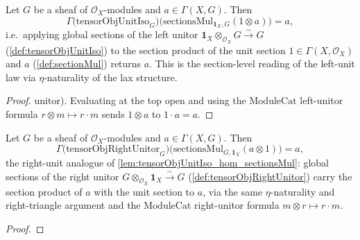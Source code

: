\begin{lemma}

  \label{lem:tensorObjUnitIso_hom_sectionsMul}
  Let \(G\) be a sheaf of \(\mathcal{O}_X\)-modules and \(a \in \Gamma(X, G)\).
  Then
  \[
    \Gamma\bigl(\mathrm{tensorObjUnitIso}_G\bigr)
      \bigl(\mathrm{sectionsMul}_{\mathbf{1}_X, G}(1 \otimes a)\bigr) = a,
  \]
  i.e.\ applying global sections of the left unitor
  \(\mathbf{1}_X \otimes_{\mathcal{O}_X} G \xrightarrow{\sim} G\)
  (\cref{def:tensorObjUnitIso}) to the section product of the unit section
  \(1 \in \Gamma(X,\mathcal{O}_X)\) and \(a\) (\cref{def:sectionMul}) returns
  \(a\). This is the section-level reading of the left-unit law via
  \(\eta\)-naturality of the lax structure.
\end{lemma}

\begin{proof}
  \leanok
  unitor). Evaluating at the top open and using the \(\mathrm{ModuleCat}\)
  left-unitor formula \(r \otimes m \mapsto r \cdot m\) sends \(1 \otimes a\) to
  \(1 \cdot a = a\).
\end{proof}

\begin{lemma}

  \label{lem:tensorObjRightUnitor_hom_sectionsMul}
  Let \(G\) be a sheaf of \(\mathcal{O}_X\)-modules and \(a \in \Gamma(X, G)\).
  Then
  \[
    \Gamma\bigl(\mathrm{tensorObjRightUnitor}_G\bigr)
      \bigl(\mathrm{sectionsMul}_{G, \mathbf{1}_X}(a \otimes 1)\bigr) = a,
  \]
  the right-unit analogue of \cref{lem:tensorObjUnitIso_hom_sectionsMul}: global
  sections of the right unitor
  \(G \otimes_{\mathcal{O}_X} \mathbf{1}_X \xrightarrow{\sim} G\)
  (\cref{def:tensorObjRightUnitor}) carry the section product of \(a\) with the
  unit section to \(a\), via the same \(\eta\)-naturality and right-triangle
  argument and the \(\mathrm{ModuleCat}\) right-unitor formula
  \(m \otimes r \mapsto r \cdot m\).
\end{lemma}

\begin{proof}
  \leanok
\end{proof}

